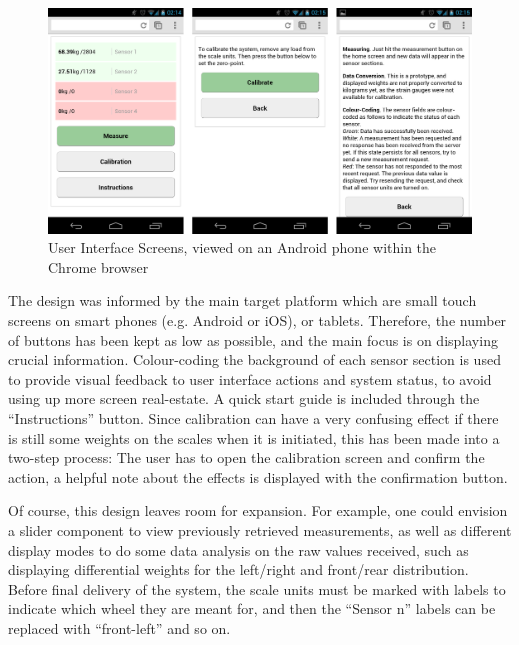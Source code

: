 \begin{figure}
\includegraphics[width=\textwidth]{images/screenshots/ui-screenshot.png}
\caption{User Interface Screens, viewed on an Android phone within the Chrome browser}
\label{ui-screenshot}
\end{figure}

The design was informed by the main target platform which are small touch screens on smart phones (e.g. Android or iOS), or tablets. Therefore, the number of buttons has been kept as low as possible, and the main focus is on displaying crucial information. Colour-coding the background of each sensor section is used to provide visual feedback to user interface actions and system status, to avoid using up more screen real-estate. A quick start guide is included through the ``Instructions'' button. Since calibration can have a very confusing effect if there is still some weights on the scales when it is initiated, this has been made into a two-step process: The user has to open the calibration screen and confirm the action, a helpful note about the effects is displayed with the confirmation button.

Of course, this design leaves room for expansion. For example, one could envision a slider component to view previously retrieved measurements, as well as different display modes to do some data analysis on the raw values received, such as displaying differential weights for the left/right and front/rear distribution. Before final delivery of the system, the scale units must be marked with labels to indicate which wheel they are meant for, and then the ``Sensor n'' labels can be replaced with ``front-left'' and so on.
